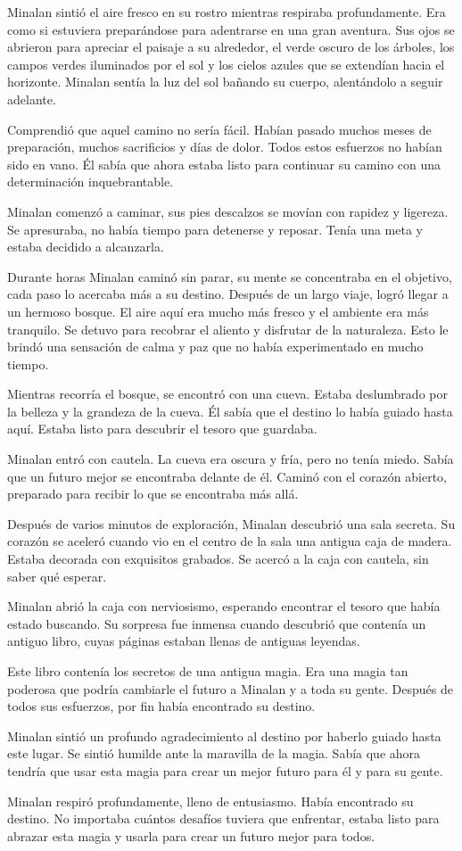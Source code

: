 

Minalan sintió el aire fresco en su rostro mientras respiraba profundamente. Era como si estuviera preparándose para adentrarse en una gran aventura. Sus ojos se abrieron para apreciar el paisaje a su alrededor, el verde oscuro de los árboles, los campos verdes iluminados por el sol y los cielos azules que se extendían hacia el horizonte. Minalan sentía la luz del sol bañando su cuerpo, alentándolo a seguir adelante.

Comprendió que aquel camino no sería fácil. Habían pasado muchos meses de preparación, muchos sacrificios y días de dolor. Todos estos esfuerzos no habían sido en vano. Él sabía que ahora estaba listo para continuar su camino con una determinación inquebrantable.

Minalan comenzó a caminar, sus pies descalzos se movían con rapidez y ligereza. Se apresuraba, no había tiempo para detenerse y reposar. Tenía una meta y estaba decidido a alcanzarla.

Durante horas Minalan caminó sin parar, su mente se concentraba en el objetivo, cada paso lo acercaba más a su destino. Después de un largo viaje, logró llegar a un hermoso bosque. El aire aquí era mucho más fresco y el ambiente era más tranquilo. Se detuvo para recobrar el aliento y disfrutar de la naturaleza. Esto le brindó una sensación de calma y paz que no había experimentado en mucho tiempo.

Mientras recorría el bosque, se encontró con una cueva. Estaba deslumbrado por la belleza y la grandeza de la cueva. Él sabía que el destino lo había guiado hasta aquí. Estaba listo para descubrir el tesoro que guardaba.

Minalan entró con cautela. La cueva era oscura y fría, pero no tenía miedo. Sabía que un futuro mejor se encontraba delante de él. Caminó con el corazón abierto, preparado para recibir lo que se encontraba más allá.

Después de varios minutos de exploración, Minalan descubrió una sala secreta. Su corazón se aceleró cuando vio en el centro de la sala una antigua caja de madera. Estaba decorada con exquisitos grabados. Se acercó a la caja con cautela, sin saber qué esperar.

Minalan abrió la caja con nerviosismo, esperando encontrar el tesoro que había estado buscando. Su sorpresa fue inmensa cuando descubrió que contenía un antiguo libro, cuyas páginas estaban llenas de antiguas leyendas.

Este libro contenía los secretos de una antigua magia. Era una magia tan poderosa que podría cambiarle el futuro a Minalan y a toda su gente. Después de todos sus esfuerzos, por fin había encontrado su destino.

Minalan sintió un profundo agradecimiento al destino por haberlo guiado hasta este lugar. Se sintió humilde ante la maravilla de la magia. Sabía que ahora tendría que usar esta magia para crear un mejor futuro para él y para su gente.

Minalan respiró profundamente, lleno de entusiasmo. Había encontrado su destino. No importaba cuántos desafíos tuviera que enfrentar, estaba listo para abrazar esta magia y usarla para crear un futuro mejor para todos.